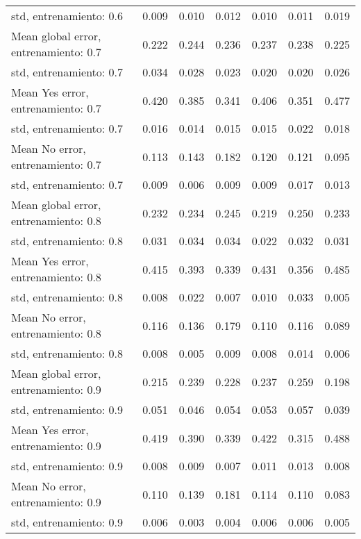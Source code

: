 \begin{longtable}{p{4cm}|p{1.5cm}|p{1.5cm}|p{1.5cm}|p{1.5cm}|p{1.5cm}|p{1.5cm}}
std, entrenamiento: 0.6               & 0.009 & 0.010 &        0.012 &     0.010 &     0.011 & 0.019 \\
Mean global error, entrenamiento: 0.7 & 0.222 & 0.244 &        0.236 &     0.237 &     0.238 & 0.225 \\
std, entrenamiento: 0.7               & 0.034 & 0.028 &        0.023 &     0.020 &     0.020 & 0.026 \\
Mean Yes error, entrenamiento: 0.7    & 0.420 & 0.385 &        0.341 &     0.406 &     0.351 & 0.477 \\
std, entrenamiento: 0.7               & 0.016 & 0.014 &        0.015 &     0.015 &     0.022 & 0.018 \\
Mean No error, entrenamiento: 0.7     & 0.113 & 0.143 &        0.182 &     0.120 &     0.121 & 0.095 \\
std, entrenamiento: 0.7               & 0.009 & 0.006 &        0.009 &     0.009 &     0.017 & 0.013 \\
Mean global error, entrenamiento: 0.8 & 0.232 & 0.234 &        0.245 &     0.219 &     0.250 & 0.233 \\
std, entrenamiento: 0.8               & 0.031 & 0.034 &        0.034 &     0.022 &     0.032 & 0.031 \\
Mean Yes error, entrenamiento: 0.8    & 0.415 & 0.393 &        0.339 &     0.431 &     0.356 & 0.485 \\
std, entrenamiento: 0.8               & 0.008 & 0.022 &        0.007 &     0.010 &     0.033 & 0.005 \\
Mean No error, entrenamiento: 0.8     & 0.116 & 0.136 &        0.179 &     0.110 &     0.116 & 0.089 \\
std, entrenamiento: 0.8               & 0.008 & 0.005 &        0.009 &     0.008 &     0.014 & 0.006 \\
Mean global error, entrenamiento: 0.9 & 0.215 & 0.239 &        0.228 &     0.237 &     0.259 & 0.198 \\
std, entrenamiento: 0.9               & 0.051 & 0.046 &        0.054 &     0.053 &     0.057 & 0.039 \\
Mean Yes error, entrenamiento: 0.9    & 0.419 & 0.390 &        0.339 &     0.422 &     0.315 & 0.488 \\
std, entrenamiento: 0.9               & 0.008 & 0.009 &        0.007 &     0.011 &     0.013 & 0.008 \\
Mean No error, entrenamiento: 0.9     & 0.110 & 0.139 &        0.181 &     0.114 &     0.110 & 0.083 \\
std, entrenamiento: 0.9               & 0.006 & 0.003 &        0.004 &     0.006 &     0.006 & 0.005 \\

\end{longtable}
